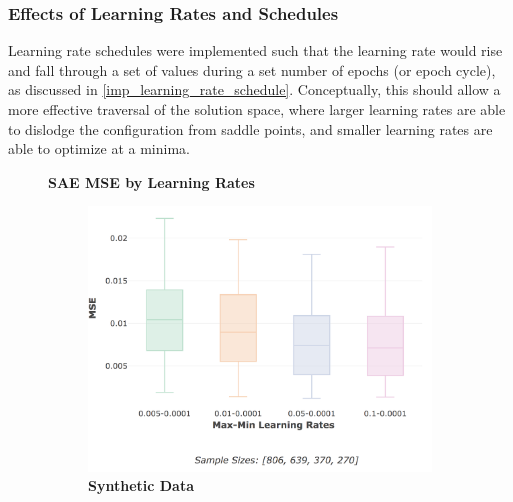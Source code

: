 \documentclass[a4paper,11pt,oneside]{article}
\theoremstyle{plain}
\theoremstyle{definition}
\begin{document}
	
	
	\subsubsection{Effects of Learning Rates and Schedules}\label{results_lr}
	
	Learning rate schedules were implemented such that the learning rate would rise and fall through a set of values during a set number of epochs (or epoch cycle), as discussed in \ref{imp_learning_rate_schedule}.	Conceptually, this should allow a more effective traversal of the solution space, where larger learning rates are able to dislodge the configuration from saddle points, and smaller learning rates are able to optimize at a minima. \newline
	
	
	\begin{figure}[H]
		\centering
		\textbf{SAE MSE by Learning Rates}
		\begin{subfigure}{.5\textwidth}
			\centering 
			\includegraphics[scale=0.3]{images/results/network/lr/synth_mse_minmax_lr.png}
			\caption{\textbf{Synthetic Data} 
				\newline }
			\label{figure-synth_mse_minmax_lr}
		\end{subfigure}%
		\begin{subfigure}{.5\textwidth}
			\centering 

\end{subfigure}
\end{figure}
\end{document}
